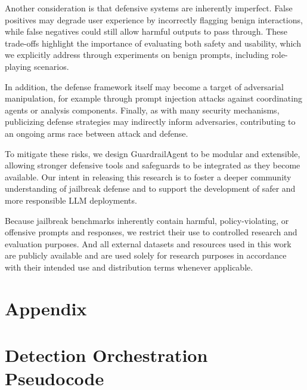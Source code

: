 \documentclass[letterpaper,twocolumn,10pt]{article}
\begin{document}
Another consideration is that defensive systems are inherently imperfect. False positives may degrade user experience by incorrectly flagging benign interactions, while false negatives could still allow harmful outputs to pass through. These trade-offs highlight the importance of evaluating both safety and usability, which we explicitly address through experiments on benign prompts, including role-playing scenarios.

In addition, the defense framework itself may become a target of adversarial manipulation, for example through prompt injection attacks against coordinating agents or analysis components. Finally, as with many security mechanisms, publicizing defense strategies may indirectly inform adversaries, contributing to an ongoing arms race between attack and defense.

To mitigate these risks, we design GuardrailAgent to be modular and extensible, allowing stronger defensive tools and safeguards to be integrated as they become available. Our intent in releasing this research is to foster a deeper community understanding of jailbreak defense and to support the development of safer and more responsible LLM deployments.

Because jailbreak benchmarks inherently contain harmful, policy-violating, or offensive prompts and responses, we restrict their use to controlled research and evaluation purposes.
And all external datasets and resources used in this work are publicly available and are used solely for research purposes in accordance with their intended use and distribution terms whenever applicable.




\appendix

\section*{Appendix}

\section{Detection Orchestration Pseudocode}
\end{document}
